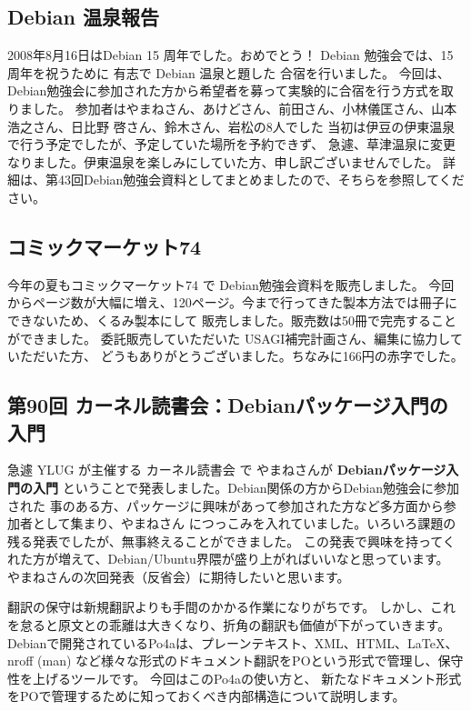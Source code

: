 \documentclass[mingoth,a4paper]{jsarticle}
\begin{document}
\subsection{Debian 温泉報告}
2008年8月16日はDebian 15 周年でした。おめでとう！ Debian 勉強会では、15周年を祝うために
有志で Debian 温泉と題した 合宿を行いました。
今回は、Debian勉強会に参加された方から希望者を募って実験的に合宿を行う方式を取りました。
参加者はやまねさん、あけどさん、前田さん、小林儀匡さん、山本 浩之さん、日比野 啓さん、鈴木さん、岩松の8人でした
当初は伊豆の伊東温泉で行う予定でしたが、予定していた場所を予約できず、
急遽、草津温泉に変更なりました。伊東温泉を楽しみにしていた方、申し訳ございませんでした。
詳細は、第43回Debian勉強会資料としてまとめましたので、そちらを参照してください。

\subsection{コミックマーケット74}
今年の夏もコミックマーケット74 で Debian勉強会資料を販売しました。
今回からページ数が大幅に増え、120ページ。今まで行ってきた製本方法では冊子にできないため、くるみ製本にして
販売しました。販売数は50冊で完売することができました。
委託販売していただいた USAGI補完計画さん、編集に協力していただいた方、
どうもありがとうございました。ちなみに166円の赤字でした。

\subsection{第90回 カーネル読書会：Debianパッケージ入門の入門}
急遽 YLUG が主催する カーネル読書会 で やまねさんが {\bf Debianパッケージ入門の入門}
ということで発表しました。Debian関係の方からDebian勉強会に参加された
事のある方、パッケージに興味があって参加された方など多方面から参加者として集まり、やまねさん
につっこみを入れていました。いろいろ課題の残る発表でしたが、無事終えることができました。
この発表で興味を持ってくれた方が増えて、Debian/Ubuntu界隈が盛り上がればいいなと思っています。
やまねさんの次回発表（反省会）に期待したいと思います。



\label{sec:po4a}

翻訳の保守は新規翻訳よりも手間のかかる作業になりがちです。
しかし、これを怠ると原文との乖離は大きくなり、折角の翻訳も価値が下がっていきます。
Debianで開発されているPo4aは、プレーンテキスト、XML、HTML、LaTeX、nroff (man)
など様々な形式のドキュメント翻訳をPOという形式で管理し、保守性を上げるツールです。
今回はこのPo4aの使い方と、
新たなドキュメント形式をPOで管理するために知っておくべき内部構造について説明します。
\end{document}
